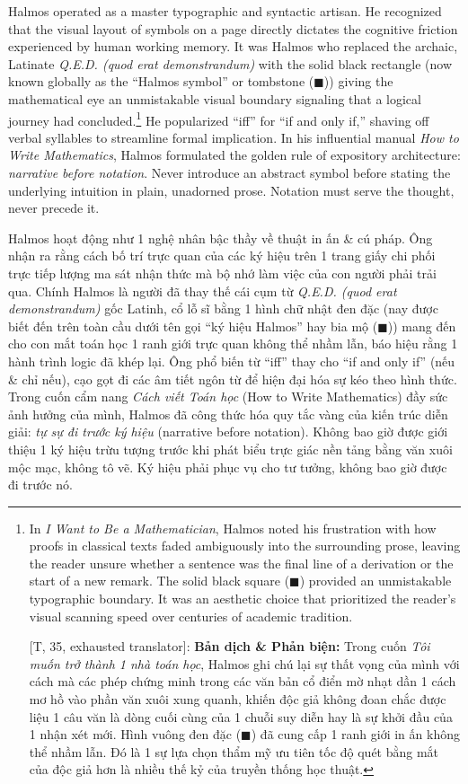 \documentclass[11pt]{article}
\begin{document}
Halmos operated as a master typographic and syntactic artisan. He recognized that the visual layout of symbols on a page directly dictates the cognitive friction experienced by human working memory. It was Halmos who replaced the archaic, Latinate \textit{Q.E.D. (quod erat demonstrandum)} with the solid black rectangle (now known globally as the ``Halmos symbol'' or tombstone ($\blacksquare$)) giving the mathematical eye an unmistakable visual boundary signaling that a logical journey had concluded.\footnote{In \textit{I Want to Be a Mathematician}, Halmos noted his frustration with how proofs in classical texts faded ambiguously into the surrounding prose, leaving the reader unsure whether a sentence was the final line of a derivation or the start of a new remark. The solid black square ($\blacksquare$) provided an unmistakable typographic boundary. It was an aesthetic choice that prioritized the reader's visual scanning speed over centuries of academic tradition.
	
	\textsf{[T, 35, exhausted translator]:} \textbf{Bản dịch \& Phản biện:} Trong cuốn \textit{Tôi muốn trở thành 1 nhà toán học}, Halmos ghi chú lại sự thất vọng của mình với cách mà các phép chứng minh trong các văn bản cổ điển mờ nhạt dần 1 cách mơ hồ vào phần văn xuôi xung quanh, khiến độc giả không đoan chắc được liệu 1 câu văn là dòng cuối cùng của 1 chuỗi suy diễn hay là sự khởi đầu của 1 nhận xét mới. Hình vuông đen đặc ($\blacksquare$) đã cung cấp 1 ranh giới in ấn không thể nhầm lẫn. Đó là 1 sự lựa chọn thẩm mỹ ưu tiên tốc độ quét bằng mắt của độc giả hơn là nhiều thế kỷ của truyền thống học thuật.} He popularized ``iff'' for ``if and only if,'' shaving off verbal syllables to streamline formal implication. In his influential manual \textit{How to Write Mathematics}, Halmos formulated the golden rule of expository architecture: \emph{narrative before notation}. Never introduce an abstract symbol before stating the underlying intuition in plain, unadorned prose. Notation must serve the thought, never precede it.

Halmos hoạt động như 1 nghệ nhân bậc thầy về thuật in ấn \& cú pháp. Ông nhận ra rằng cách bố trí trực quan của các ký hiệu trên 1 trang giấy chi phối trực tiếp lượng ma sát nhận thức mà bộ nhớ làm việc của con người phải trải qua. Chính Halmos là người đã thay thế cái cụm từ \textit{Q.E.D. (quod erat demonstrandum)} gốc Latinh, cổ lỗ sĩ bằng 1 hình chữ nhật đen đặc (nay được biết đến trên toàn cầu dưới tên gọi ``ký hiệu Halmos'' hay bia mộ ($\blacksquare$)) mang đến cho con mắt toán học 1 ranh giới trực quan không thể nhầm lẫn, báo hiệu rằng 1 hành trình logic đã khép lại. Ông phổ biến từ ``iff'' thay cho ``if and only if'' (nếu \& chỉ nếu), cạo gọt đi các âm tiết ngôn từ để hiện đại hóa sự kéo theo hình thức. Trong cuốn cẩm nang \textit{Cách viết Toán học} (How to Write Mathematics) đầy sức ảnh hưởng của mình, Halmos đã công thức hóa quy tắc vàng của kiến trúc diễn giải: \emph{tự sự đi trước ký hiệu} (narrative before notation). Không bao giờ được giới thiệu 1 ký hiệu trừu tượng trước khi phát biểu trực giác nền tảng bằng văn xuôi mộc mạc, không tô vẽ. Ký hiệu phải phục vụ cho tư tưởng, không bao giờ được đi trước nó.
\end{document}
